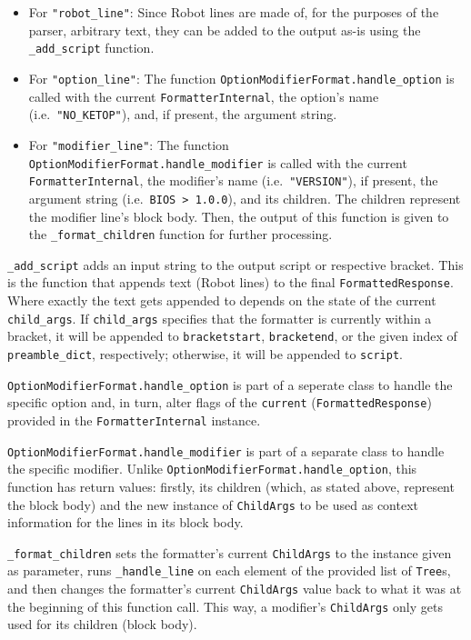 \begin{itemize}
    \item For \verb|"robot_line"|: Since Robot lines are made of, for the purposes of the parser, arbitrary text, they can be added to the output as-is using the \verb|_add_script| function.
    \item For \verb|"option_line"|: The function \verb|OptionModifierFormat.handle_option| is called with the current \verb|FormatterInternal|, the option's name (i.e.\ \verb|"NO_KETOP"|), and, if present, the argument string.
    \item For \verb|"modifier_line"|: The function \verb|OptionModifierFormat.handle_modifier| is called with the current \verb|FormatterInternal|, the modifier's name (i.e.\ \verb|"VERSION"|), if present, the argument string (i.e.\ \verb|BIOS > 1.0.0|), and its children. The children represent the modifier line's block body. Then, the output of this function is given to the \verb|_format_children| function for further processing.
\end{itemize}

\verb|_add_script| adds an input string to the output script or respective bracket. This is the function that appends text (Robot lines) to the final \verb|FormattedResponse|. Where exactly the text gets appended to depends on the state of the current \verb|child_args|. If \verb|child_args| specifies that the formatter is currently within a bracket, it will be appended to \verb|bracketstart|, \verb|bracketend|, or the given index of \verb|preamble_dict|, respectively; otherwise, it will be appended to \verb|script|.

\verb|OptionModifierFormat.handle_option| is part of a seperate class to handle the specific option and, in turn, alter flags of the \verb|current| (\verb|FormattedResponse|) provided in the \verb|FormatterInternal| instance. 

\verb|OptionModifierFormat.handle_modifier| is part of a separate class to handle the specific modifier. Unlike \verb|OptionModifierFormat.handle_option|, this function has return values: firstly, its children (which, as stated above, represent the block body) and the new instance of \verb|ChildArgs| to be used as context information for the lines in its block body. 

\verb|_format_children| sets the formatter's current \verb|ChildArgs| to the instance given as parameter, runs \verb|_handle_line| on each element of the provided list of \verb|Tree|s, and then changes the formatter's current \verb|ChildArgs| value back to what it was at the beginning of this function call. This way, a modifier's \verb|ChildArgs| only gets used for its children (block body). 

